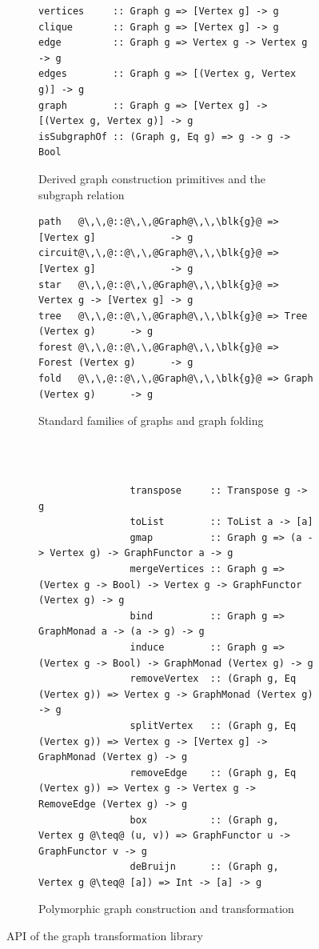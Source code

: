 \begin{figure}
\begin{subfigure}[b]{0.56\linewidth}
\begin{verbatim}
vertices     :: Graph g => [Vertex g] -> g
clique       :: Graph g => [Vertex g] -> g
edge         :: Graph g => Vertex g -> Vertex g -> g
edges        :: Graph g => [(Vertex g, Vertex g)] -> g
graph        :: Graph g => [Vertex g] -> [(Vertex g, Vertex g)] -> g
isSubgraphOf :: (Graph g, Eq g) => g -> g -> Bool
\end{verbatim}
\caption{Derived graph construction primitives and the subgraph relation}
\end{subfigure}
\hfill
\hfill
\vrule
\hfill
\hfill
\begin{subfigure}[b]{0.4\linewidth}
\begin{verbatim}
path   @\,\,@::@\,\,@Graph@\,\,\blk{g}@ => [Vertex g]             -> g
circuit@\,\,@::@\,\,@Graph@\,\,\blk{g}@ => [Vertex g]             -> g
star   @\,\,@::@\,\,@Graph@\,\,\blk{g}@ => Vertex g -> [Vertex g] -> g
tree   @\,\,@::@\,\,@Graph@\,\,\blk{g}@ => Tree   (Vertex g)      -> g
forest @\,\,@::@\,\,@Graph@\,\,\blk{g}@ => Forest (Vertex g)      -> g
fold   @\,\,@::@\,\,@Graph@\,\,\blk{g}@ => Graph  (Vertex g)      -> g
\end{verbatim}
\caption{Standard families of graphs and graph folding}
\end{subfigure}
~\\
~\\
\begin{subfigure}[b]{\linewidth}
\begin{verbatim}
                transpose     :: Transpose g -> g
                toList        :: ToList a -> [a]
                gmap          :: Graph g => (a -> Vertex g) -> GraphFunctor a -> g
                mergeVertices :: Graph g => (Vertex g -> Bool) -> Vertex g -> GraphFunctor (Vertex g) -> g
                bind          :: Graph g => GraphMonad a -> (a -> g) -> g
                induce        :: Graph g => (Vertex g -> Bool) -> GraphMonad (Vertex g) -> g
                removeVertex  :: (Graph g, Eq (Vertex g)) => Vertex g -> GraphMonad (Vertex g) -> g
                splitVertex   :: (Graph g, Eq (Vertex g)) => Vertex g -> [Vertex g] -> GraphMonad (Vertex g) -> g
                removeEdge    :: (Graph g, Eq (Vertex g)) => Vertex g -> Vertex g -> RemoveEdge (Vertex g) -> g
                box           :: (Graph g, Vertex g @\teq@ (u, v)) => GraphFunctor u -> GraphFunctor v -> g
                deBruijn      :: (Graph g, Vertex g @\teq@ [a]) => Int -> [a] -> g
\end{verbatim}
\caption{Polymorphic graph construction and transformation}
\end{subfigure}
\vspace{-4mm}
\caption{API of the graph transformation library\label{fig-api}}
\end{figure}


